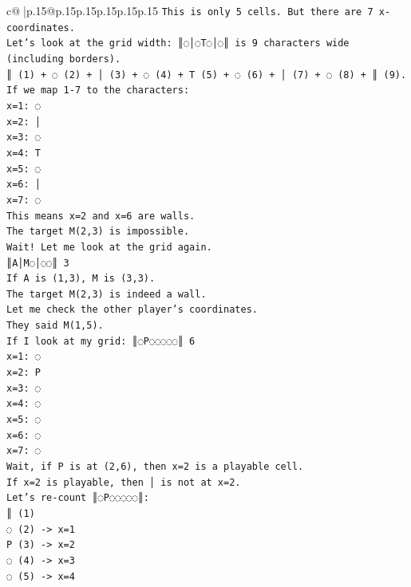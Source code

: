 \documentclass{article}
\begin{document}
{\begin{supertabular}{c@{$\;$}|p{.15\linewidth}@{}p{.15\linewidth}p{.15\linewidth}p{.15\linewidth}p{.15\linewidth}p{.15\linewidth}}
{{{\texttt{This is only 5 cells. But there are 7 x{-}coordinates.} \\
\texttt{Let's look at the grid width: ║◌│◌T◌│◌║ is 9 characters wide (including borders).} \\
\texttt{║ (1) + ◌ (2) + │ (3) + ◌ (4) + T (5) + ◌ (6) + │ (7) + ◌ (8) + ║ (9).} \\
\texttt{If we map 1{-}7 to the characters:} \\
\texttt{x=1: ◌} \\
\texttt{x=2: │} \\
\texttt{x=3: ◌} \\
\texttt{x=4: T} \\
\texttt{x=5: ◌} \\
\texttt{x=6: │} \\
\texttt{x=7: ◌} \\
\texttt{This means x=2 and x=6 are walls.} \\
\texttt{The target M(2,3) is impossible.} \\
\texttt{Wait! Let me look at the grid again.} \\
\texttt{║A│M◌│◌◌║ 3} \\
\texttt{If A is (1,3), M is (3,3).} \\
\texttt{The target M(2,3) is indeed a wall.} \\
\texttt{Let me check the other player's coordinates.} \\
\texttt{They said M(1,5).} \\
\texttt{If I look at my grid: ║◌P◌◌◌◌◌║ 6} \\
\texttt{x=1: ◌} \\
\texttt{x=2: P} \\
\texttt{x=3: ◌} \\
\texttt{x=4: ◌} \\
\texttt{x=5: ◌} \\
\texttt{x=6: ◌} \\
\texttt{x=7: ◌} \\
\texttt{Wait, if P is at (2,6), then x=2 is a playable cell.} \\
\texttt{If x=2 is playable, then │ is not at x=2.} \\
\texttt{Let's re{-}count ║◌P◌◌◌◌◌║:} \\
\texttt{║ (1)} \\
\texttt{◌ (2) {-}> x=1} \\
\texttt{P (3) {-}> x=2} \\
\texttt{◌ (4) {-}> x=3} \\
\texttt{◌ (5) {-}> x=4} \\
}}}
\end{supertabular}}
\end{document}
